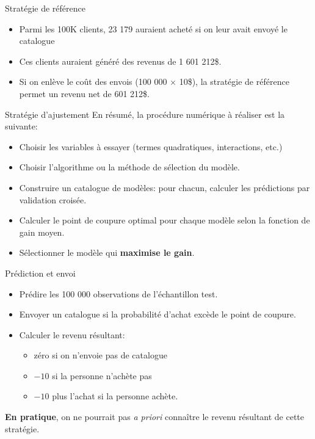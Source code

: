 \documentclass[
  ignorenonframetext,
]{beamer}
\providecommand{\tightlist}{%
  \setlength{\itemsep}{0pt}\setlength{\parskip}{0pt}}\usepackage{longtable,booktabs,array}
\begin{document}
\begin{frame}{Stratégie de référence}
\protect\hypertarget{stratuxe9gie-de-ruxe9fuxe9rence}{}
\begin{itemize}
\tightlist
\item
  Parmi les 100K clients, 23 179 auraient acheté si on leur avait envoyé
  le catalogue
\item
  Ces clients auraient généré des revenus de 1 601 212\$.
\item
  Si on enlève le coût des envois (100 000 \(\times\) 10\$), la
  stratégie de référence permet un revenu net de 601 212\$.
\end{itemize}
\end{frame}

\begin{frame}{Stratégie d'ajustement}
\protect\hypertarget{stratuxe9gie-dajustement}{}
En résumé, la procédure numérique à réaliser est la suivante:

\begin{itemize}
\tightlist
\item
  Choisir les variables à essayer (termes quadratiques, interactions,
  etc.)
\item
  Choisir l'algorithme ou la méthode de sélection du modèle.
\item
  Construire un catalogue de modèles: pour chacun, calculer les
  prédictions par validation croisée.
\item
  Calculer le point de coupure optimal pour chaque modèle selon la
  fonction de gain moyen.
\item
  Sélectionner le modèle qui \textbf{maximise le gain}.
\end{itemize}
\end{frame}

\begin{frame}{Prédiction et envoi}
\protect\hypertarget{pruxe9diction-et-envoi}{}
\begin{itemize}
\tightlist
\item
  Prédire les 100 000 observations de l'échantillon test.
\item
  Envoyer un catalogue si la probabilité d'achat excède le point de
  coupure.
\item
  Calculer le revenu résultant:

  \begin{itemize}
  \tightlist
  \item
    zéro si on n'envoie pas de catalogue
  \item
    \(-10\) si la personne n'achète pas
  \item
    \(-10\) plus l'achat si la personne achète.
  \end{itemize}
\end{itemize}

\textbf{En pratique}, on ne pourrait pas \emph{a priori} connaître le
revenu résultant de cette stratégie.
\end{frame}
\end{document}
